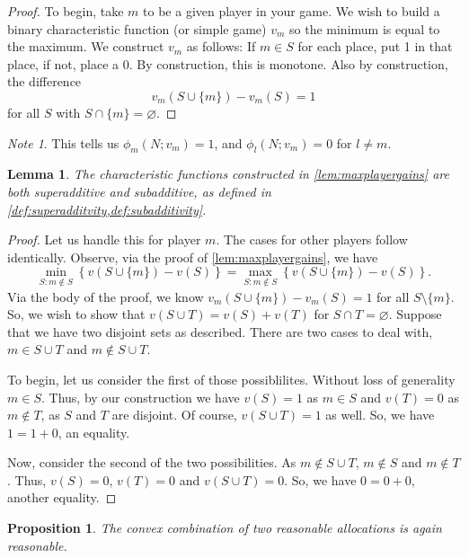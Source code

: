 \documentclass[12pt,letterpaper,final]{article}
\theoremstyle{plain}
\theoremstyle{plain}
\newtheorem{proposition}[theorem]{Proposition}
\theoremstyle{plain}
\newtheorem{lemma}[theorem]{Lemma}
\theoremstyle{plain}
\theoremstyle{plain}
\theoremstyle{plain}
\theoremstyle{plain}
\theoremstyle{definition}
\theoremstyle{definition}
\theoremstyle{definition}
\theoremstyle{definition}
\theoremstyle{definition}
\theoremstyle{remark}
\theoremstyle{remark}
\newtheorem*{note}{Note}
\theoremstyle{remark}
\theoremstyle{remark}
\begin{document}
\begin{proof}
  To begin, take \(m\) to be a given player in your game. We wish to
  build a binary characteristic function (or simple game) \(v_m\) so the minimum is equal
  to the maximum. We construct \(v_m\) as follows: If \(m \in S\) for each
  place, put 1 in that place, if not, place a 0. By construction, this
  is monotone. Also by construction, the difference
  \[v_m\left(S\cup\{m\}\right)-v_m(S) = 1\] for all \(S\) with
  \(S\cap\{m\} = \varnothing\). 
\end{proof}

\begin{note}
  This tells us
  \(\phi_m(N;v_m) = 1\), and \(\phi_l(N;v_m) = 0\) for \(l \neq m\).
\end{note}

\begin{lemma}\label{lem:charFuncSuperadd}
  The characteristic functions constructed in
  \cref{lem:maxplayergains} are both superadditive and subadditive, as
  defined in \cref{def:superadditvity,def:subadditivity}.
\end{lemma}

\begin{proof}
  Let us handle this for player \(m\). The cases for other players
  follow identically.  Observe, via the proof of
  \cref{lem:maxplayergains}, we have
  \[
    \min_{S:m \notin S}\left\{ v\left(S\cup\{m\}\right) - v(S)\right\} =
    \max_{S:m\notin S}\left\{v\left(S \cup \{m\}\right) - v(S)\right\}.    
  \]
  Via the body of the proof, we know
  \(v_m\left(S\cup\{m\}\right)-v_m(S) = 1\) for all
  \(S\setminus \{m\}\). So, we wish to show that
  \(v(S\cup T) = v(S) +v(T)\) for \(S\cap T = \varnothing\).
  Suppose that we have two disjoint sets as described. There are two
  cases to deal with, \(m\in S\cup T\) and \(m\notin S\cup T\).
  
  To begin, let us consider the first of those possiblilites. Without
  loss of generality \(m \in S\). Thus, by our construction we have
  \(v(S) = 1\) as \(m\in S\) and \(v(T) = 0\) as \(m\notin T\), as
  \(S\) and \(T\) are disjoint. Of course, \(v(S\cup T) = 1\) as
  well. So, we have \(1=1+0\), an equality.

  Now, consider the second of the two possibilities. As \(m\notin
  S\cup T\), \(m\notin S\) and \(m\notin T\). Thus, \(v(S) = 0\),
  \(v(T) = 0\) and \(v(S\cup T) = 0\). So, we have \(0= 0+0\),
  another equality.   
\end{proof}

\begin{proposition}\label{prop:convexComboMaps}
  The convex combination of two reasonable allocations is again
  reasonable.
\end{proposition}
\end{document}
